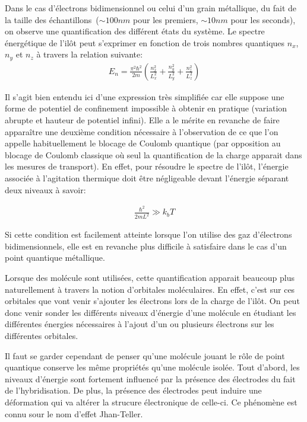 Dans le cas d'électrons bidimensionnel ou celui d'un grain métallique, du fait de la taille des échantillons~($\sim 100nm$ pour les premiers, $\sim 10nm$ pour les seconds), on observe une quantification des différent états du système. Le spectre énergétique de l'il\^ot peut s'exprimer en fonction de trois nombres quantiques $n_x$,$n_y$ et $n_z$ à travers la relation suivante:
\begin{eqnarray}
E_n = \frac{\pi^2 \hbar^2}{2m}(\frac{n_x^2}{L_x^2} + \frac{n_y^2}{L_y^2} + \frac{n_z^2}{L_z^2}) \nonumber
\end{eqnarray}


Il s'agit bien entendu ici d'une expression très simplifiée car elle suppose une forme de potentiel de confinement impossible à obtenir en pratique (variation abrupte et hauteur de potentiel infini). Elle a le mérite en revanche de faire appara\^itre une deuxième condition nécessaire à l'observation de ce que l'on appelle habituellement le blocage de Coulomb quantique (par opposition au blocage de Coulomb classique où seul la quantification de la charge apparait dans les mesures de transport). En effet, pour résoudre le spectre de l'il\^ot, l'énergie associée à l'agitation thermique doit \^etre négligeable devant l'énergie séparant deux niveaux à savoir:

\begin{eqnarray}
\frac{\hbar^2}{2mL^2} \gg k_bT \nonumber
\end{eqnarray}

Si cette condition est facilement atteinte lorsque l'on utilise des gaz d'électrons bidimensionnels, elle est en revanche plus difficile à satisfaire dans le cas d'un point quantique métallique. \newline


Lorsque des molécule sont utilisées, cette quantification apparait beaucoup plus naturellement à travers la notion d'orbitales moléculaires. En effet, c'est sur ces orbitales que vont venir s'ajouter les électrons lors de la charge de l'il\^ot. On peut donc venir sonder les différents niveaux d'énergie d'une molécule en étudiant les différentes énergies nécessaires à l'ajout d'un ou plusieurs électrons sur les différentes orbitales. 

Il faut se garder cependant de penser qu'une molécule jouant le r\^ole de point quantique conserve les m\^eme propriétés qu'une molécule isolée. Tout d'abord, les niveaux d'énergie sont fortement influencé par la présence des électrodes du fait de l'hybridisation. De plus, la présence des électrodes peut induire une déformation qui va altérer la strucure électronique de celle-ci. Ce phénomène est connu sour le nom d'effet Jhan-Teller. 

